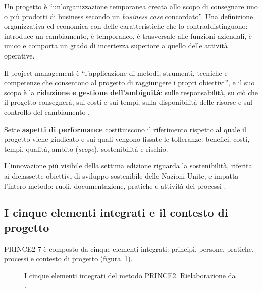 Un progetto \`e ``un'organizzazione temporanea creata allo scopo di consegnare
uno o pi\`u prodotti di business secondo un \emph{business case} concordato''.
Una definizione organizzativa ed economica con delle caratteristiche che lo
contraddistinguono: introduce un
cambiamento, \`e temporaneo, \`e trasversale alle funzioni aziendali, \`e unico
e comporta un grado di incertezza superiore a quello delle attivit\`a operative.

Il project management \`e ``l'applicazione di metodi, strumenti, tecniche e
competenze che consentono al progetto di raggiungere i propri obiettivi'', e il
suo scopo \`e la \textbf{riduzione e gestione dell'ambiguit\`a}: sulle
responsabilit\`a, su ci\`o che il progetto consegner\`a, sui costi e sui tempi,
sulla disponibilit\`a delle risorse e sul controllo del cambiamento
\cite{prince27}.

Sette \textbf{aspetti di performance} costituiscono il riferimento rispetto al
quale il progetto viene giudicato e sui quali vengono fissate le tolleranze:
benefici, costi, tempi, qualit\`a, ambito (\emph{scope}), sostenibilit\`a e
rischio.

L'innovazione pi\`u visibile della settima edizione riguarda la sostenibilit\`a,
riferita ai diciassette obiettivi di sviluppo sostenibile delle Nazioni Unite,
e impatta l'intero metodo: ruoli, documentazione, pratiche e attivit\`a dei processi
\cite{prince27}.


\subsection{I cinque elementi integrati e il contesto di progetto}

PRINCE2 7 \`e composto da cinque elementi integrati: principi, persone,
pratiche, processi e contesto di progetto (figura~\ref{fig:p2-elementi}).

\begin{figure}[htbp]
\centering
{}
\caption{I cinque elementi integrati del metodo PRINCE2. Rielaborazione da \cite{prince27}.}
\label{fig:p2-elementi}
\end{figure}
\newpage

